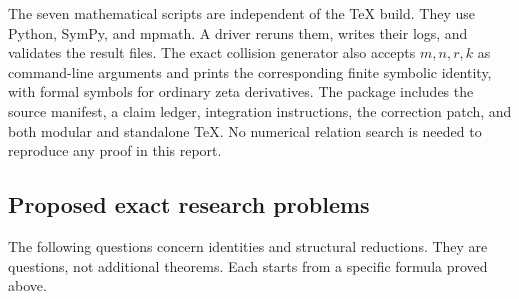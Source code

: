 \documentclass[11pt,a4paper]{article}
\numberwithin{equation}{section}
\theoremstyle{definition}
\theoremstyle{remark}
\begin{document}
The seven mathematical scripts are independent of the TeX build. They
use Python, SymPy, and mpmath. A driver reruns them, writes their logs,
and validates the result files. The exact collision generator also
accepts $m,n,r,k$ as command-line arguments and prints the corresponding
finite symbolic identity, with formal symbols for ordinary zeta
derivatives. The package includes the source manifest, a claim ledger,
integration instructions, the correction patch, and both modular and
standalone TeX. No numerical relation search is needed to reproduce any
proof in this report.

\subsection{Proposed exact research problems}
\label{xid:sec:further-research}

The following questions concern identities and structural reductions.
They are questions, not additional theorems. Each starts from a specific
formula proved above.
\end{document}
